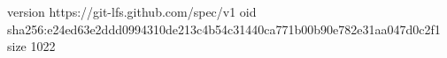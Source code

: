 version https://git-lfs.github.com/spec/v1
oid sha256:e24ed63e2ddd0994310de213c4b54c31440ca771b00b90e782e31aa047d0c2f1
size 1022
